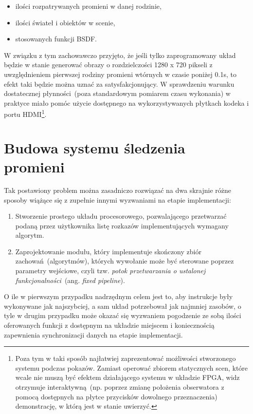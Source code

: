 \begin{enumerate}
\begin{itemize}
\item ilości rozpatrywanych promieni w danej rodzinie,
\item ilości świateł i obiektów w scenie,
\item stosowanych funkcji BSDF.
\end{itemize} 
W związku z tym zachowawczo przyjęto, że jeśli tylko zaprogramowany układ będzie w stanie generować obrazy o rozdzielczości 1280 x 720 pikseli z uwzględnieniem pierwszej rodziny promieni wtórnych w czasie poniżej 0.1s, to efekt taki będzie można uznać za satysfakcjonujący. W sprawdzeniu warunku dostatecznej płynności~(poza standardowym pomiarem czasu wykonania) w praktyce miało pomóc użycie dostępnego na wykorzystywanych płytkach kodeka i portu HDMI\footnote{Poza tym w taki sposób najłatwiej zaprezentować możliwości stworzonego systemu podczas pokazów. Zamiast operować zbiorem statycznych scen, które wcale nie muszą być efektem działającego systemu w układzie FPGA, widz otrzymuje interaktywną~(np. poprzez zmianę położenia obserwatora z pomocą dostępnych na płytce przycisków dowolnego przeznaczenia) demonstrację, w którą jest w stanie uwierzyć.}.
\end{enumerate}

\section{Budowa systemu śledzenia promieni}
Tak postawiony problem można zasadniczo rozwiązać na dwa skrajnie różne sposoby wiążące się z zupełnie innymi wyzwaniami na etapie implementacji:
\begin{enumerate}
\item Stworzenie prostego układu procesorowego, pozwalającego przetwarzać podaną przez użytkownika listę rozkazów implementujących wymagany algorytm.
\item Zaprojektowanie modułu, który implementuje skończony zbiór zachowań~(algorytmów), których wywołanie może być sterowane poprzez parametry wejściowe, czyli tzw. \textit{potok przetwarzania o ustalonej funkcjonalności}~(ang. \textit{fixed pipeline}).
\end{enumerate}
O ile w pierwszym przypadku nadrzędnym celem jest to, aby instrukcje były wykonywane jak najszybciej, a sam układ potrzebował jak najmniej zasobów, o tyle w drugim przypadku może okazać się wyzwaniem pogodzenie ze sobą ilości oferowanych funkcji z dostępnym na układzie miejscem i koniecznością zapewnienia synchronizacji danych na etapie implementacji.


